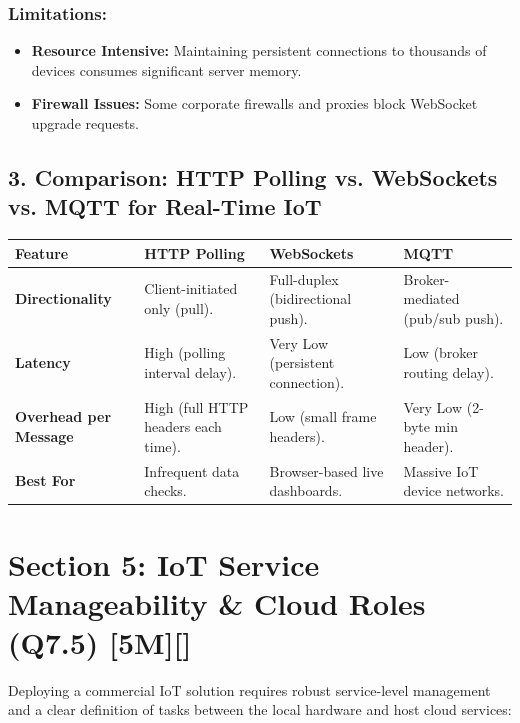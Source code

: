 \subsubsection{Limitations:}
\begin{itemize}
  \item   \textbf{Resource Intensive:} Maintaining persistent connections to thousands of devices consumes significant server memory.
  \item   \textbf{Firewall Issues:} Some corporate firewalls and proxies block WebSocket upgrade requests.
\end{itemize}


\subsection{3. Comparison: HTTP Polling vs. WebSockets vs. MQTT for Real-Time IoT}

\begin{table}[H]
\centering
\begin{tabular}{|p{}|p{}|p{}|p{}|}
\hline
Feature & HTTP Polling & WebSockets & MQTT \\
\hline
\textbf{Directionality} & Client-initiated only (pull). & Full-duplex (bidirectional push). & Broker-mediated (pub/sub push). \\
\hline
\textbf{Latency} & High (polling interval delay). & Very Low (persistent connection). & Low (broker routing delay). \\
\hline
\textbf{Overhead per Message} & High (full HTTP headers each time). & Low (small frame headers). & Very Low (2-byte min header). \\
\hline
\textbf{Best For} & Infrequent data checks. & Browser-based live dashboards. & Massive IoT device networks. \\
\hline
\end{tabular}
\end{table}


\section{Section 5: IoT Service Manageability \& Cloud Roles (Q7.5) [5M][]}

Deploying a commercial IoT solution requires robust service-level management and a clear definition of tasks between the local hardware and host cloud services:

